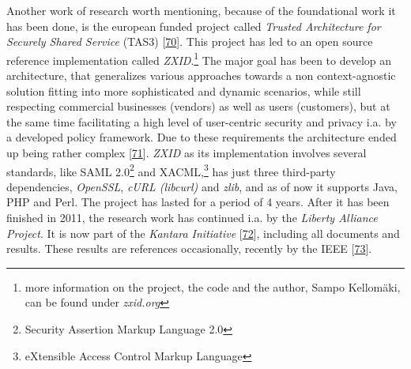 \documentclass[12pt,english,a4paper,titlepage,cleardoublepage=empty,dottedtoc]{report}
\begin{document}
Another work of research worth mentioning, because of the foundational
work it has been done, is the european funded project called
\emph{Trusted Architecture for Securely Shared Service} (TAS3)
{[}\protect\hyperlink{ref-web_2011_tas3-project}{70}{]}. This project
has led to an open source reference implementation called
\emph{ZXID}.\footnote{more information on the project, the code and the
  author, Sampo Kellomäki, can be found under \emph{zxid.org}} The major
goal has been to develop an architecture, that generalizes various
approaches towards a non context-agnostic solution fitting into more
sophisticated and dynamic scenarios, while still respecting commercial
businesses (vendors) as well as users (customers), but at the same time
facilitating a high level of user-centric security and privacy i.a. by a
developed policy framework. Due to these requirements the architecture
ended up being rather complex
{[}\protect\hyperlink{ref-graphic_2011_architecture_components-of-organization-domain}{71}{]}.
\emph{ZXID} as its implementation involves several standards, like SAML
2.0\footnote{Security Assertion Markup Language 2.0} and
XACML,\footnote{eXtensible Access Control Markup Language} has just
three third-party dependencies, \emph{OpenSSL}, \emph{cURL (libcurl)}
and \emph{zlib}, and as of now it supports Java, PHP and Perl. The
project has lasted for a period of 4 years. After it has been finished
in 2011, the research work has continued i.a. by the \emph{Liberty
Alliance Project}. It is now part of the \emph{Kantara Initiative}
{[}\protect\hyperlink{ref-web_kantara-initiative}{72}{]}, including all
documents and results. These results are references occasionally,
recently by the IEEE
{[}\protect\hyperlink{ref-paper_2014_personal-data-store-approach}{73}{]}.
\end{document}
